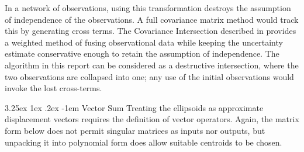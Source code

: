 \documentclass[a4paper, 11pt, titlepage]{article}
\makeatletter
\newcounter{subsubsubsection}[subsubsection]
\renewcommand\paragraph{\@startsection{paragraph}{5}{\z@}%
  {3.25ex \@plus1ex \@minus.2ex}%
  {-1em}%
  {\normalfont\normalsize\bfseries}}
\makeatother
\begin{document}
        In a network of observations, using this transformation destroys the assumption of independence of the observations.  A full covariance matrix method would track this by generating cross terms.  The Covariance Intersection described in \cite{CovarNoCorrel} provides a weighted method of fusing observational data while keeping the uncertainty estimate conservative enough to retain the assumption of independence.
        The algorithm in this report can be considered as a destructive intersection, where the two observations are collapsed into one; any use of the initial observations would invoke the lost cross-terms.

      
        \paragraph{Vector Sum}
          Treating the ellipsoids as approximate displacement vectors requires the definition of vector operators.
          Again, the matrix form below does not permit singular matrices as inputs nor outputs, but unpacking it into polynomial form does allow suitable centroids to be chosen.
\end{document}
